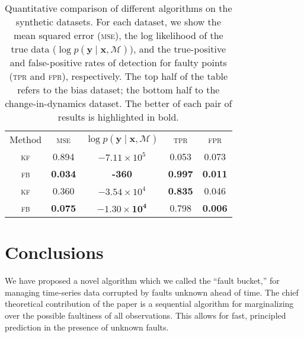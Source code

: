 \documentclass{article}
\newcommand{\given}{\ensuremath{\mid}}
\newcommand{\cm}[1]{\ensuremath{\mathcal{#1}}}
\newcommand{\bm}[1]{\ensuremath{\mathbf{#1}}}
\begin{document}
\begin{table}
  \centering
  \caption{Quantitative comparison of different algorithms on the
    synthetic datasets.  For each dataset, we show the mean squared error
    (\textsc{mse}), the log likelihood of the true data ($\log p(\bm{y}
    \given \bm{x}, \cm{M})$), and the true-positive and false-positive rates
    of detection for faulty points (\textsc{tpr} and \textsc{fpr}),
    respectively.  The top half of the table refers to the
    bias dataset; the bottom half to the change-in-dynamics
    dataset. The better of each pair of results is highlighted in
    bold.}
  \label{tbl:results}
  \begin{tabular}{ccccc}
    \toprule
    Method & \scshape{mse} & $\log p(\bm{y} \given \bm{x}, \cm{M})$ & \scshape{tpr} & \scshape{fpr} \\
    \cmidrule{1-1} \cmidrule(l){2-5} 
    \scshape{kf} & 0.894 & $-7.11 \times 10^5$ & 0.053 & 0.073 \\
    \scshape{fb} & \textbf{0.034} & \textbf{-360} & \textbf{0.997} & \textbf{0.011} \\
    \midrule
    \scshape{kf} & 0.360 & $-3.54 \times 10^4$ & \textbf{0.835} & 0.046 \\
    \scshape{fb} & \textbf{0.075} & $\mathbf{-1.30 \times 10^4}$ & 0.798 & \textbf{0.006} \\
    \bottomrule
  \end{tabular}
\end{table}

\section{Conclusions}
We have proposed a novel algorithm which we called the ``fault
bucket,'' for managing time-series data corrupted by faults unknown
ahead of time. The chief theoretical contribution of the paper is a
sequential algorithm for marginalizing over the possible faultiness of
all observations. This allows for fast, principled prediction in the
presence of unknown faults.



\end{document}
